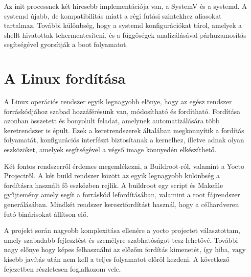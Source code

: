 Az init processnek két híresebb implementációja van, a SystemV és a systemd. A systemd újabb, de kompatibilitás miatt a régi futási szintekhez aliasokat tartalmaz. További különbség, hogy a systemd konfigurációkat tárol, amelyek a
shellt hivatottak tehermentesíteni, és a függőségek analizálásával párhuzamosítás segítségével gyorsítják a boot folyamatot.

\section{A Linux fordítása}

A Linux operációs rendszer egyik legnagyobb előnye, hogy az egész rendszer forráskódjához szabad hozzáférésünk van, módosítható és fordítható. Fordítása azonban összetett és bonyolult feladat, amelynek automatizálására
több keretrendszer is épült. Ezek a keretrendszerek általában megkönnyítik a fordítás folyamatát, konfigurációs interfészt biztosítanak a kernelhez, illetve adnak olyan eszközöket, amelyek segítségével a végső image könnyedén
elkészíthető.

Két fontos rendszerről érdemes megemlékezni, a Buildroot-ról, valamint a Yocto Projectről. A két build rendszer között az egyik legnagyobb különbség a fordításra használt fő eszközben rejlik. A buildroot egy script és Makefile
gyűjtemény amely segít a forráskód lefordításában, valamint a root fájrendszer generálásában. Mindkét rendszer keresztfordítást használ, hogy a célhardveren futó binárisokat állítson elő.

A projekt során nagyobb komplexitása ellenére a yocto projectet választottam, amely szabadabb fejlesztést és személyre szabhatóságot tesz lehetővé. További nagy előnye hogy képes felhasználni az előzőm fordítás kimenetét, így hiba,
vagy kisebb javítás után nem kell a teljes folyamatot előröl kezdeni. A következő fejezetben részletesen foglalkozom vele.




